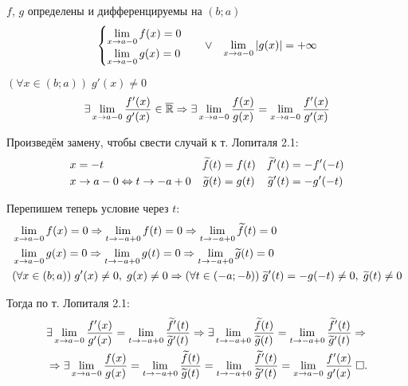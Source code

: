 \documentclass{article}
\begin{document}
\theorem[Лопиталя 2.2]

$f$, $g$ определены и дифференцируемы на $(b;a)$
\begin{align*}
	\begin{cases}
		\lim\limits_{x\to a-0}f(x)=0 \\
		\lim\limits_{x\to a-0}g(x)=0
	\end{cases} &  & \lor &  & \lim\limits_{x\to a-0}|g(x)|=+\infty
\end{align*}

$(\forall x\in(b;a))\;g'(x)\neq 0$
\begin{align*}
	\exists \lim\limits_{x\to a-0}\frac{f'(x)}{g'(x)}\in\overline{\mathbb{R}}\Rightarrow\exists\lim\limits_{x\to a-0}\frac{f(x)}{g(x)}=\lim\limits_{x\to a-0}\frac{f'(x)}{g'(x)}
\end{align*}

\pagebreak
\proof

\newcommand\ft{\widetilde{f}}
\newcommand\gt{\widetilde{g}}

Произведём замену, чтобы свести случай к т. Лопиталя 2.1:
\begin{align*}
	 & x=-t                     & \ft(t) & =f(t) & \ft'(t) & =-f'(-t) \\
	 & x\to a-0\Lrarr t\to -a+0 & \gt(t) & =g(t) & \gt'(t) & =-g'(-t)
\end{align*}

Перепишем теперь условие через $t$:
\begin{align*}
	 & \slim{x\to a-0}f(x)=0\Rarr\slim{t\to -a+0}f(t)=0\Rarr\slim{t\to -a+0}\ft(t)=0                                 \\
	 & \slim{x\to a-0}g(x)=0\Rarr\slim{t\to -a+0}g(t)=0\Rarr\slim{t\to -a+0}\gt(t)=0                                 \\
	 & (\forall x\in(b;a))\;g'(x)\neq 0,\;g(x)\neq 0\Rarr (\forall t\in(-a;-b))\;\gt'(t)=-g(-t)\neq 0,\;\gt(t)\neq 0
\end{align*}

Тогда по т. Лопиталя 2.1:
\begin{align*}
	 & \exists\slim{x\to a-0}\frac{f'(x)}{g'(x)}=\slim{t\to -a+0}\frac{\ft'(t)}{\gt'(t)}\Rarr
	\exists\slim{t\to -a+0}\frac{\ft(t)}{\gt(t)}=\slim{t\to -a+0}\frac{\ft'(t)}{\gt'(t)}\Rarr                                                                            \\
	 & \Rarr\exists\slim{x\to a-0}\frac{f(x)}{g(x)}=\slim{t\to -a+0}\frac{\ft(t)}{\gt(t)}=\slim{t\to -a+0}\frac{\ft'(t)}{\gt'(t)}=\slim{x\to a-0}\frac{f'(x)}{g'(x)}\qed
\end{align*}
\end{document}
